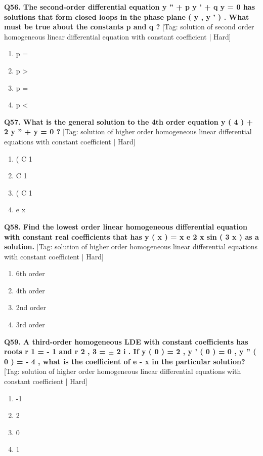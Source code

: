 \noindent\textbf{Q56. The second-order differential equation y '' + p y ' + q y = 0 has solutions that form closed loops in the phase plane ( y , y ' ) . What must be true about the constants p and q ?} \hfill [Tag: solution of second order homogeneous linear differential equation with constant coefficient | Hard]
\begin{enumerate}[label=(\alph*),topsep=2pt,itemsep=1pt,partopsep=0pt,parsep=0pt]
    \item {{p =}}
    \item {{p >}}
    \item {{p =}}
    \item {{p <}}
\end{enumerate}
\vspace{2mm}

\noindent\textbf{Q57. What is the general solution to the 4th order equation y ( 4 ) + 2 y '' + y = 0 ?} \hfill [Tag: solution of higher order homogeneous linear differential equations with constant coefficient | Hard]
\begin{enumerate}[label=(\alph*),topsep=2pt,itemsep=1pt,partopsep=0pt,parsep=0pt]
    \item {{( C 1}}
    \item {{C 1}}
    \item {{( C 1}}
    \item {{e x}}
\end{enumerate}
\vspace{2mm}

\noindent\textbf{Q58. Find the lowest order linear homogeneous differential equation with constant real coefficients that has y ( x ) = x e 2 x sin ( 3 x ) as a solution.} \hfill [Tag: solution of higher order homogeneous linear differential equations with constant coefficient | Hard]
\begin{enumerate}[label=(\alph*),topsep=2pt,itemsep=1pt,partopsep=0pt,parsep=0pt]
    \item {{6th order}}
    \item {{4th order}}
    \item {{2nd order}}
    \item {{3rd order}}
\end{enumerate}
\vspace{2mm}

\noindent\textbf{Q59. A third-order homogeneous LDE with constant coefficients has roots r 1 = - 1 and r 2 , 3 = $\pm$ 2 i . If y ( 0 ) = 2 , y ' ( 0 ) = 0 , y '' ( 0 ) = - 4 , what is the coefficient of e - x in the particular solution?} \hfill [Tag: solution of higher order homogeneous linear differential equations with constant coefficient | Hard]
\begin{enumerate}[label=(\alph*),topsep=2pt,itemsep=1pt,partopsep=0pt,parsep=0pt]
    \item {{-1}}
    \item {{2}}
    \item {{0}}
    \item {{1}}
\end{enumerate}
\vspace{2mm}

